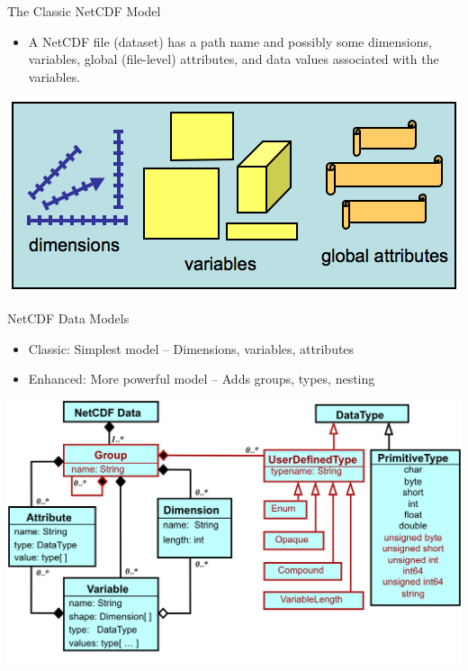 \documentclass[compress,11pt,xcolor=svgnames,aspectratio=169]{beamer}
\begin{document}
\begin{frame}[t]{The Classic NetCDF Model}

\begin{itemize}

\item A NetCDF file (dataset) has a path name and possibly some dimensions, variables, global (file-level) attributes, and data values associated with the variables.

\end{itemize}

\begin{center}
\includegraphics[scale=0.6]{fig/netcdf-classic}
\end{center}

\end{frame}

\begin{frame}[t]{NetCDF Data Models}

    \begin{itemize}

        \item Classic: Simplest model -- Dimensions, variables, attributes

        \item Enhanced: More powerful model -- Adds groups, types, nesting

    \end{itemize}

    \begin{center}
    \includegraphics[scale=0.5]{fig/nc4-uml}
    \end{center}

\end{frame}
\end{document}
